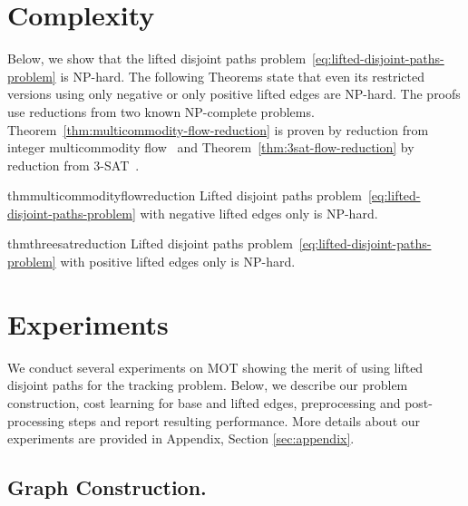 \documentclass{article}
\begin{document}
  \section{Complexity}
\label{sec:complexity}



Below, we show that the lifted disjoint paths problem~\eqref{eq:lifted-disjoint-paths-problem} is NP-hard. The following Theorems state that even its restricted versions  using only negative or only positive lifted edges are NP-hard.
The proofs use reductions from two known NP-complete problems. Theorem~\ref{thm:multicommodity-flow-reduction} is proven by reduction from integer multicommodity flow~\cite{EvenMulti} and Theorem~\ref{thm:3sat-flow-reduction}  by reduction from 3-SAT~\cite{cook1971complexity}.




\begin{restatable}{thm}{multicommodityflowreduction}
\label{thm:multicommodity-flow-reduction}
Lifted disjoint paths problem~\eqref{eq:lifted-disjoint-paths-problem} with negative lifted edges only is NP-hard.
\end{restatable}

\begin{restatable}{thm}{threesatreduction}
\label{thm:3sat-flow-reduction}
Lifted disjoint paths problem~\eqref{eq:lifted-disjoint-paths-problem} with positive lifted edges only is NP-hard.
\end{restatable}

  \section{Experiments}
\label{sec:experiments}


We conduct several experiments on MOT showing the merit of using lifted disjoint paths for the tracking problem.
Below, we describe our problem construction, cost learning for base and lifted edges, preprocessing and post-processing steps and report resulting performance. More details about our experiments are provided in Appendix, Section \ref{sec:appendix}.
\subsection{Graph Construction.}
\end{document}
